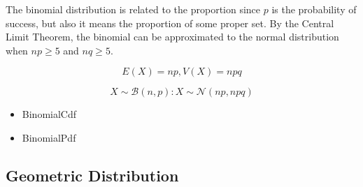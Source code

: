     The binomial distribution is related to the proportion since $p$ is the probability of success, but also it means the proportion of some proper set. By the Central Limit Theorem, the binomial can be approximated to the normal distribution when $np\geq5$ and $nq\geq5$.

    \begin{equation}
        E(X) = np, V(X) = npq
        \label{E(X), V(X): X ~ B(n, p)}
    \end{equation}

    \begin{equation}
        X\sim\mathcal{B}(n, p) : X \sim\mathcal{N}(np, npq)
        \label{B(n, p) -> N(np, npq)}
    \end{equation}

    \begin{itemize}
        \item BinomialCdf
        \item BinomialPdf   
    \end{itemize}

\subsection{Geometric Distribution}